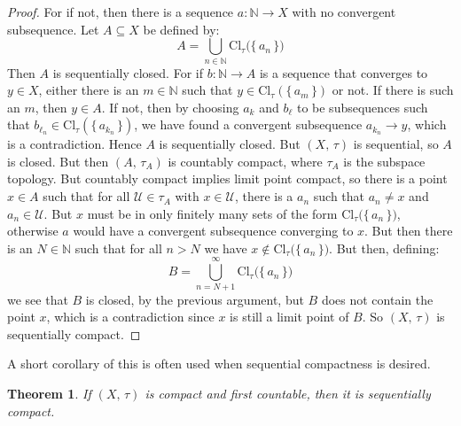 \documentclass{article}
\theoremstyle{plain}
\newtheorem{theorem}{Theorem}[section]
\theoremstyle{normal}
\begin{document}
        \begin{proof}
            For if not, then there is a sequence $a:\mathbb{N}\rightarrow{X}$
            with no convergent subsequence. Let $A\subseteq{X}$ be defined by:
            \begin{equation}
                A=\bigcup_{n\in\mathbb{N}}
                    \textrm{Cl}_{\tau}\big(\{\,a_{n}\,\}\big)
            \end{equation}
            Then $A$ is sequentially closed. For if
            $b:\mathbb{N}\rightarrow{A}$ is a sequence that converges to
            $y\in{X}$, either there is an $m\in\mathbb{N}$ such that
            $y\in\textrm{Cl}_{\tau}(\{\,a_{m}\,\})$ or not. If there is
            such an $m$, then $y\in{A}$. If not, then by choosing
            $a_{k}$ and $b_{\ell}$ to be subsequences such that
            $b_{\ell_{n}}\in\textrm{Cl}_{\tau}(\{\,a_{k_{n}}\,\})$, we have
            found a convergent subsequence $a_{k_{n}}\rightarrow{y}$, which is
            a contradiction. Hence $A$ is sequentially closed. But
            $(X,\,\tau)$ is sequential, so $A$ is closed. But then
            $(A,\,\tau_{A})$ is countably compact, where $\tau_{A}$ is the
            subspace topology. But countably compact implies limit point
            compact, so there is a point $x\in{A}$ such that for all
            $\mathcal{U}\in\tau_{A}$ with $x\in\mathcal{U}$, there is a
            $a_{n}$ such that $a_{n}\ne{x}$ and $a_{n}\in\mathcal{U}$. But
            $x$ must be in only finitely many sets of the form
            $\textrm{Cl}_{\tau}\big(\{\,a_{n}\,\}\big)$, otherwise
            $a$ would have a convergent subsequence converging to $x$.
            But then there is an $N\in\mathbb{N}$ such that for all
            $n>N$ we have $x\notin\textrm{Cl}_{\tau}\big(\{\,a_{n}\,\}\big)$.
            But then, defining:
            \begin{equation}
                B=\bigcup_{n=N+1}^{\infty}
                    \textrm{Cl}_{\tau}\big(\{\,a_{n}\,\}\big)
            \end{equation}
            we see that $B$ is closed, by the previous argument, but $B$
            does not contain the point $x$, which is a contradiction since
            $x$ is still a limit point of $B$. So $(X,\,\tau)$ is
            sequentially compact.
        \end{proof}
        A short corollary of this is often used when sequential compactness is
        desired.
        \begin{theorem}
            If $(X,\,\tau)$ is compact and first countable, then it is
            sequentially compact.
        \end{theorem}
\end{document}
